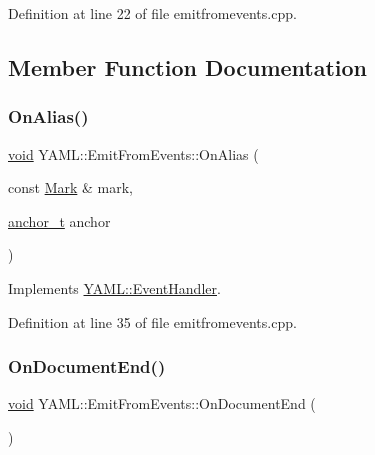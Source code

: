 Definition at line 22 of file emitfromevents.\+cpp.



\subsection{Member Function Documentation}
\mbox{\label{class_y_a_m_l_1_1_emit_from_events_aa002fddfe2450e68bb7dc58c8245b702}} 
\subsubsection{\texorpdfstring{OnAlias()}{OnAlias()}}
{\footnotesize\ttfamily \mbox{\hyperlink{glad_8h_a950fc91edb4504f62f1c577bf4727c29}{void}} Y\+A\+M\+L\+::\+Emit\+From\+Events\+::\+On\+Alias (\begin{DoxyParamCaption}\item[{const \mbox{\hyperlink{struct_y_a_m_l_1_1_mark}{Mark}} \&}]{mark,  }\item[{\mbox{\hyperlink{namespace_y_a_m_l_abeff1798814ae3402fc5665fdcad1de6}{anchor\+\_\+t}}}]{anchor }\end{DoxyParamCaption})\hspace{0.3cm}{\ttfamily [virtual]}}



Implements \mbox{\hyperlink{class_y_a_m_l_1_1_event_handler_a3459009c2aad49b3226e009fc06d33b6}{Y\+A\+M\+L\+::\+Event\+Handler}}.



Definition at line 35 of file emitfromevents.\+cpp.

\mbox{\label{class_y_a_m_l_1_1_emit_from_events_ae9e5f8acf7b2a9dfb74967c11e49cb5e}} 
\subsubsection{\texorpdfstring{OnDocumentEnd()}{OnDocumentEnd()}}
{\footnotesize\ttfamily \mbox{\hyperlink{glad_8h_a950fc91edb4504f62f1c577bf4727c29}{void}} Y\+A\+M\+L\+::\+Emit\+From\+Events\+::\+On\+Document\+End (\begin{DoxyParamCaption}{ }\end{DoxyParamCaption})\hspace{0.3cm}{\ttfamily [virtual]}}



